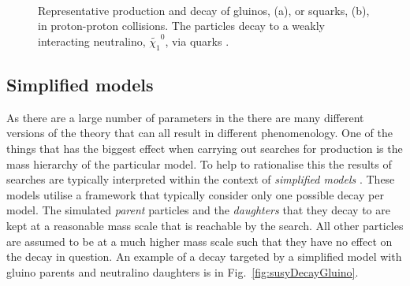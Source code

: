 \begin{figure}
  \centering
  ~~~ 
  \caption{Representative \SUSY production and decay of gluinos, (a), or
  squarks, (b), in proton-proton collisions. The \SUSY particles decay
  to a weakly interacting neutralino, $\tilde{\chi_1}^0$, via \SM
  quarks \cite{smsTwiki}.}
  \label{fig:susyDecay}
\end{figure}

\subsection{Simplified models}

As there are a large number of parameters in the \MSSM there are many
different versions of the theory that can all result in different
\SUSY phenomenology. One of the things that has the biggest effect
when carrying out searches for \SUSY production is the mass hierarchy
of the particular model. To help to rationalise this the results of
\SUSY searches are typically interpreted within the context of
\emph{simplified models} \cite{Alwall:2008ag,Alves:2011wf}. These
models utilise a \SMS framework that typically consider only one
possible \SUSY decay per model. The simulated \emph{parent} \SUSY
particles and the \emph{daughters} that they decay to are kept at a
reasonable mass scale that is reachable by the search. All other \SUSY
particles are assumed to be at a much higher mass scale such that they
have no effect on the decay in question. An example of a decay
targeted by a simplified model with gluino parents and neutralino
daughters is in Fig.~\ref{fig:susyDecayGluino}. 

